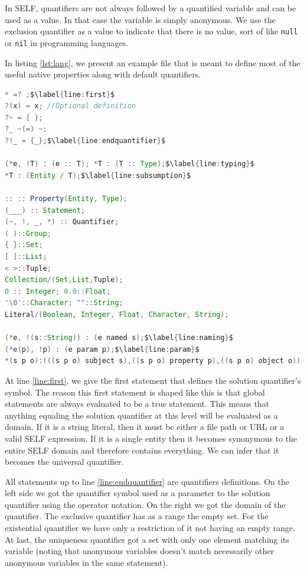 \documentclass[11pt,a4paper,twoside,openright,titlepage,numbers=noenddot,headinclude,cleardoublepage=empty,openany]{scrreprt}
\theoremstyle{plain}
\theoremstyle{definition}
\theoremstyle{remark}
\newcommand{\passthrough}[1]{#1}
\begin{document}
In SELF, quantifiers are not always followed by a quantified variable
and can be used as a value. In that case the variable is simply
anonymous. We use the exclusion quantifier as a value to indicate that
there is no value, sort of like \passthrough{\lstinline!null!} or
\passthrough{\lstinline!nil!} in programming languages.

In listing \ref{lst:lang}, we present an example file that is meant to
define most of the useful native properties along with default
quantifiers.

\begin{lstlisting}[language=Java, caption={The default lang.w file.}, escapechar={$}, label=lst:lang]
* =? ;$\label{line:first}$
?(x) = x; //Optional definition
?~ = { };
?_ ~(=) ~;
?!_ = {_};$\label{line:endquantifier}$

(*e, !T) : (e :: T); *T : (T :: Type);$\label{line:typing}$
*T : (Entity / T);$\label{line:subsumption}$

:: :: Property(Entity, Type);
(___) :: Statement;
(~, !, _, *) :: Quantifier;
( )::Group;
{ }::Set;
[ ]::List;
< >::Tuple;
Collection/(Set,List,Tuple);
0 :: Integer; 0.0::Float;
'\0'::Character; ""::String;
Literal/(Boolean, Integer, Float, Character, String);

(*e, !(s::String)) : (e named s);$\label{line:naming}$
(*e(p), !p) : (e param p);$\label{line:param}$
*(s p o):(((s p o) subject s),((s p o) property p),((s p o) object o));$\label{line:incidence}$
\end{lstlisting}

At line \ref{line:first}, we give the first statement that defines the
solution quantifier's symbol. The reason this first statement is shaped
like this is that global statements are always evaluated to be a true
statement. This means that anything equaling the solution quantifier at
this level will be evaluated as a domain. If it is a string literal,
then it must be either a file path or URL or a valid SELF expression. If
it is a single entity then it becomes synonymous to the entire SELF
domain and therefore contains everything. We can infer that it becomes
the universal quantifier.

All statements up to line \ref{line:endquantifier} are quantifiers
definitions. On the left side we got the quantifier symbol used as a
parameter to the solution quantifier using the operator notation. On the
right we got the domain of the quantifier. The exclusive quantifier has
as a range the empty set. For the existential quantifier we have only a
restriction of it not having an empty range. At last, the uniqueness
quantifier got a set with only one element matching its variable (noting
that anonymous variables doesn't match necessarily other anonymous
variables in the same statement).
\end{document}
